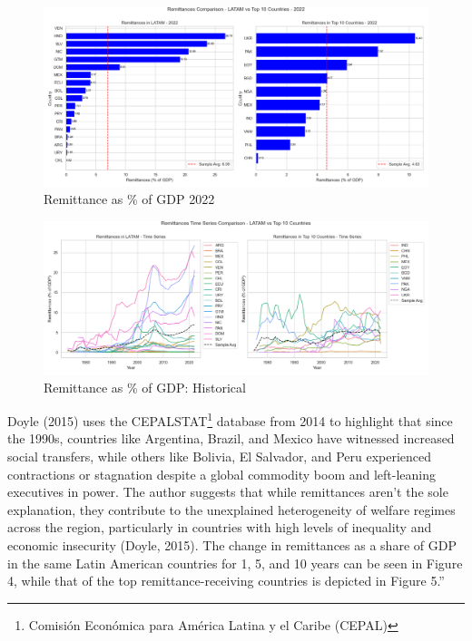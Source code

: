 \documentclass[
]{article}
\begin{document}
\begin{figure}
\hypertarget{fig:label}{%
\centering
\includegraphics[width=1\textwidth,height=1\textheight]{rem22_lat_top.png}
\caption{Remittance as \% of GDP 2022}\label{fig:label}
}
\end{figure}

\begin{figure}
\hypertarget{fig:label}{%
\centering
\includegraphics[width=1\textwidth,height=1\textheight]{remhist_lat_top.png}
\caption{Remittance as \% of GDP: Historical}\label{fig:label}
}
\end{figure}

Doyle (2015) uses the CEPALSTAT\footnote{Comisión Económica para América
  Latina y el Caribe (CEPAL)} database from 2014 to highlight that since
the 1990s, countries like Argentina, Brazil, and Mexico have witnessed
increased social transfers, while others like Bolivia, El Salvador, and
Peru experienced contractions or stagnation despite a global commodity
boom and left-leaning executives in power. The author suggests that
while remittances aren't the sole explanation, they contribute to the
unexplained heterogeneity of welfare regimes across the region,
particularly in countries with high levels of inequality and economic
insecurity (Doyle, 2015). The change in remittances as a share of GDP in
the same Latin American countries for 1, 5, and 10 years can be seen in
Figure 4, while that of the top remittance-receiving countries is
depicted in Figure 5.''
\end{document}
